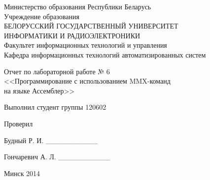 \thispagestyle{empty}
\setlength{\parindent}{0ex} %

\begin{center}
  Министерство образования Республики Беларусь \\
  \vspace{0.5ex}
  Учреждение образования \\
  БЕЛОРУССКИЙ ГОСУДАРСТВЕННЫЙ УНИВЕРСИТЕТ \\
  ИНФОРМАТИКИ И РАДИОЭЛЕКТРОНИКИ \\
  \vspace{0.5ex}
  Факультет информационных технологий и управления \\
  \vspace{0.5ex}
  Кафедра информационных технологий автоматизированных систем
\end{center}

\vspace{50mm}

\begin{center}
  Отчет по лабораторной работе № 6 \\
  <<Программирование с использованием MMX-команд \\ на языке Ассемблер>>
\end{center}

\vspace{40mm}

\begin{minipage}{.55\linewidth}
    Выполнил студент группы 120602

    \smallskip

    Проверил
\end{minipage}
\hfill
\begin{minipage}{.4\linewidth}
  \begin{flushright}
    Будный Р. И. \_\_\_\_\_\_\_\_\_\_

    \smallskip

    Гончаревич А. Л. \_\_\_\_\_\_\_\_\_\_
  \end{flushright}
\end{minipage}

\vspace{65mm}
\begin{center}
  Минск 2014
\end{center}

\setlength{\parindent}{1.25cm} %

\newpage
